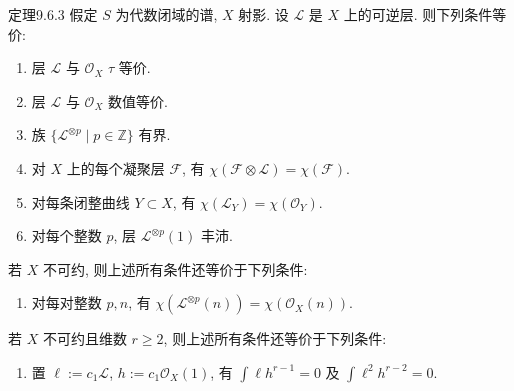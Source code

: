 \begin{origstatement}{定理}{9.6.3}\label{ch09s6:th963}
假定 $S$ 为代数闭域的谱, $X$ 射影. 设 $\mathcal L$ 是 $X$ 上的可逆层. 则下列条件等价:
\begin{enumerate}
\item[(a)] 层 $\mathcal L$ 与 $\mathcal O_X$ $\tau$ 等价.
\item[(b)] 层 $\mathcal L$ 与 $\mathcal O_X$ 数值等价.
\item[(c)] 族 $\{\mathcal L^{\otimes p}\mid p\in\mathbb Z\}$ 有界.
\item[(d)] 对 $X$ 上的每个凝聚层 $\mathcal F$, 有 $\chi(\mathcal F\otimes\mathcal L)=\chi(\mathcal F)$.
\item[(e)] 对每条闭整曲线 $Y\subset X$, 有 $\chi(\mathcal L_Y)=\chi(\mathcal O_Y)$.
\item[(f)] 对每个整数 $p$, 层 $\mathcal L^{\otimes p}(1)$ 丰沛.
\end{enumerate}
若 $X$ 不可约, 则上述所有条件还等价于下列条件:
\begin{enumerate}\item[(g)] 对每对整数 $p,n$, 有 $\chi(\mathcal L^{\otimes p}(n))=\chi(\mathcal O_X(n))$.\end{enumerate}
若 $X$ 不可约且维数 $r\geq2$, 则上述所有条件还等价于下列条件:
\begin{enumerate}\item[(h)] 置 $\ell:=c_1\mathcal L$, $h:=c_1\mathcal O_X(1)$, 有 $\int\ell h^{r-1}=0$ 及 $\int\ell^2h^{r-2}=0$.\end{enumerate}
\end{origstatement}

